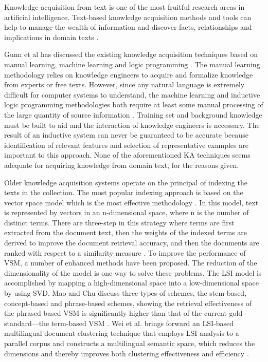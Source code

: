 \documentclass{elsart}
\begin{document}
Knowledge acquisition from text is one of the most fruitful research
areas in artificial intelligence. Text-based knowledge acquisition
methods and tools can help to manage the wealth of information and
discover facts, relationships and implications in domain texts
\cite{Hahn2000,Gunn1999}. 

Gunn et al has discussed the existing knowledge acquisition techniques based
on manual learning, machine learning and logic programming \cite{Gunn1999}. The
manual learning methodology relies on knowledge engineers to acquire
and formalize knowledge from experts or free texts. However, since any
natural language is extremely difficult for computer systems to
understand, the machine learning and inductive logic programming
methodologies both require at least some manual processing of the
large quantity of source information
\cite{matwin:tac,Richardson1997}. Training set and background
knowledge must be built to aid and the interaction of knowledge
engineers is necessary. The result of an inductive system can never be
guaranteed to be accurate because identification of relevant features
and selection of representative examples are important to this
approach. None of the aforementioned KA techniques seems adequate for
acquiring knowledge from domain text, for the reasons given. 

Older knowledge acquisition systems operate on the principal of
indexing the texts in the collection. The most popular indexing
approach is based on the vector space model
\cite{361220,salton1975vsm} which is the most effective methodology \cite{215383}. In this model,
text is represented by vectors in an n-dimensional space, where n is
the number of distinct terms. There are three-step in this strategy where
terms are first extracted from the document text, then the weights of
the indexed terms are derived to improve the document retrieval
accuracy, and then the documents are ranked with respect to a
similarity measure \cite{Raghavan1986}. To improve the performance of
VSM, a number of enhanced methods have been proposed. The reduction of
the dimensionality of the model is one way to solve these
problems. The LSI model is accomplished by mapping a high-dimensional
space into a low-dimensional space by using SVD. Mao and Chu discuss three types of schemes, the stem-based, concept-based
and phrase-based schemes, showing the retrieval effectiveness of the
phrased-based VSM is significantly higher than that of the current
gold-standard—the term-based VSM \cite{Mao2007}. Wei et
al. brings forward an LSI-based multilingual document clustering technique
that employs LSI analysis to a parallel corpus and constructs a
multilingual semantic space, which reduces the dimensions and thereby
improves both clustering effectiveness and efficiency \cite{Wei2008}.
\end{document}
